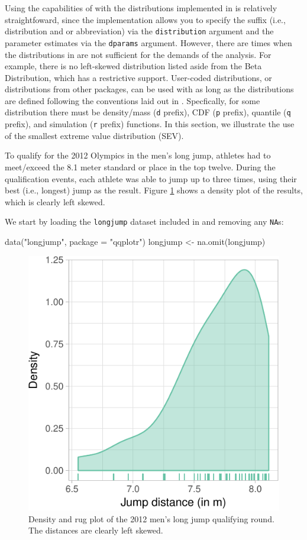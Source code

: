 \label{sec:user-dists}

Using the capabilities of  with the distributions
implemented in  is relatively straightfoward, since the
implementation allows you to specify the suffix (i.e., distribution and
or abbreviation) via the \texttt{distribution} argument and the
parameter estimates via the \texttt{dparams} argument. However, there
are times when the distributions in  are not sufficient for
the demands of the analysis. For example, there is no left-skewed
distribution listed aside from the Beta Distribution, which has a
restrictive support. User-coded distributions, or distributions from
other packages, can be used with  as long as the
distributions are defined following the conventions laid out in
. Specfically, for some distribution there must be
density/mass (\texttt{d} prefix), CDF (\texttt{p} prefix), quantile
(\texttt{q} prefix), and simulation (\texttt{r} prefix) functions. In
this section, we illustrate the use of the smallest extreme value
distribution (SEV).

To qualify for the 2012 Olympics in the men's long jump, athletes had to
meet/exceed the 8.1 meter standard or place in the top twelve. During
the qualification events, each athlete was able to jump up to three
times, using their best (i.e., longest) jump as the result. Figure
\ref{fig:jump-density} shows a density plot of the results, which is
clearly left skewed.

We start by loading the \texttt{longjump} dataset included in
 and removing any \texttt{NA}s:

\begin{Schunk}
\begin{Sinput}
data("longjump", package = "qqplotr")
longjump <- na.omit(longjump)
\end{Sinput}
\end{Schunk}

\begin{Schunk}
\begin{figure}

{\centering \includegraphics[width=0.45\linewidth]{loy-figures/jump-density-1} 

}

\caption[Density and rug plot of the 2012 men's long jump qualifying round]{Density and rug plot of the 2012 men's long jump qualifying round. The distances are clearly left skewed.}\label{fig:jump-density}
\end{figure}
\end{Schunk}


